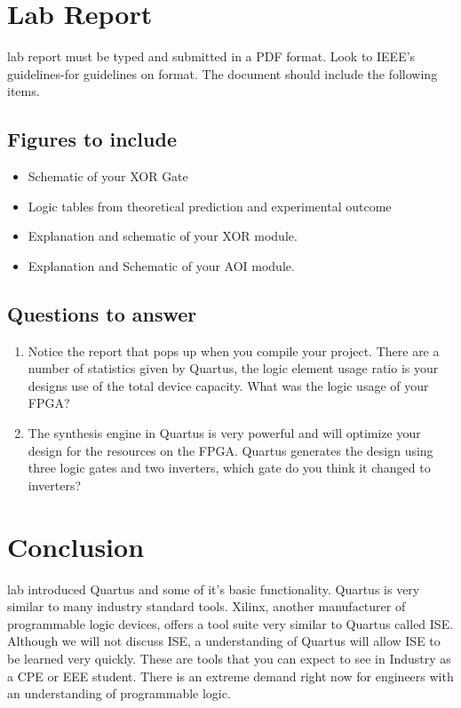   \section{Lab Report}
     lab report must be typed and submitted in a PDF format. Look to IEEE's guidelines-for  guidelines on format. The document should include the following items.
    
    \subsection{Figures to include}
    \begin{itemize}
      \item Schematic of your XOR Gate
      \item Logic tables from theoretical prediction and experimental outcome
      \item Explanation and schematic of your XOR module.
      \item Explanation and Schematic of your AOI module.
    \end{itemize}

    \subsection{Questions to answer}
    \begin{enumerate}
      \item Notice the report that pops up when you compile your project. There are a number of statistics given by Quartus, the logic element usage ratio is your designs use of the total device capacity. What was the logic usage of your FPGA?
      \item The synthesis engine in Quartus is very powerful and will optimize your design for the resources on the   FPGA. Quartus generates the design using three logic gates and two inverters, which gate do you think it changed to inverters?
    \end{enumerate}

  \section{Conclusion}
     lab introduced Quartus and some of it's basic functionality. Quartus is very similar to many industry standard tools. Xilinx, another manufacturer of programmable logic devices, offers a tool suite very similar to Quartus called ISE. Although we will not discuss ISE, a understanding of Quartus will allow ISE to be learned very quickly. These are tools that you can expect to see in Industry as a CPE or EEE student. There is an extreme demand right now for engineers with an understanding of programmable logic.

  

